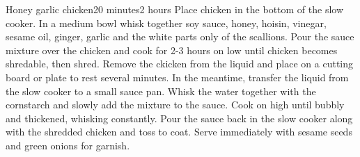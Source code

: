 \begin{recipe}{Honey garlic chicken}{20 minutes}{2 hours}
  Place chicken in the bottom of the slow cooker.
  In a medium bowl whisk together soy sauce, honey, hoisin, vinegar, sesame oil, ginger, garlic and the white parts only of the scallions. Pour the sauce mixture over the chicken and cook for 2-3 hours on low until chicken becomes shredable, then shred.
  Remove the ckicken from the liquid and place on a cutting board or plate to rest several minutes. In the meantime, transfer the liquid from the slow cooker to a small sauce pan. Whisk the water together with the cornstarch and slowly add the mixture to the sauce. Cook on high until bubbly and thickened, whisking constantly. Pour the sauce back in the slow cooker along with the shredded chicken and toss to coat.
  Serve immediately with sesame seeds and green onions for garnish.
\end{recipe}
